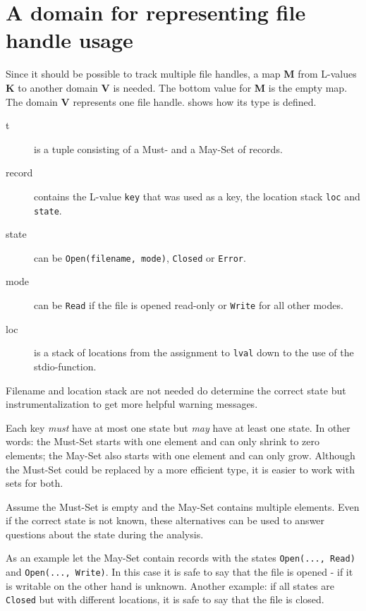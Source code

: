 \section{A domain for representing file handle usage}
Since it should be possible to track multiple file handles, a map \textbf{M} from L-values \textbf{K} to another domain \textbf{V} is needed. The bottom value for \textbf{M} is the empty map.
The domain \textbf{V} represents one file handle.  shows how its type  is defined.
\begin{description}
\item[t] is a tuple consisting of a Must- and a May-Set of records.

\item[record] contains the L-value \verb|key| that was used as a key, the location stack \verb|loc| and \verb|state|.

\item[state] can be \verb|Open(filename, mode)|, \verb|Closed| or \verb|Error|.

\item[mode] can be \verb|Read| if the file is opened read-only or \verb|Write| for all other modes.

\item[loc] is a stack of locations from the assignment to \verb|lval| down to the use of the stdio-function.
\end{description}
Filename and location stack are not needed do determine the correct state but instrumentalization to get more helpful warning messages.

Each key \textit{must} have at most one state but \textit{may} have at least one state.
In other words: the Must-Set starts with one element and can only shrink to zero elements; the May-Set also starts with one element and can only grow.
Although the Must-Set could be replaced by a more efficient type, it is easier to work with sets for both.

Assume the Must-Set is empty and the May-Set contains multiple elements. Even if the correct state is not known, these alternatives can be used to answer questions about the state during the analysis.

As an example let the May-Set contain records with the states \verb|Open(..., Read)| and \verb|Open(..., Write)|. In this case it is safe to say that the file is opened - if it is writable on the other hand is unknown. Another example: if all states are \verb|Closed| but with different locations, it is safe to say that the file is closed. %

